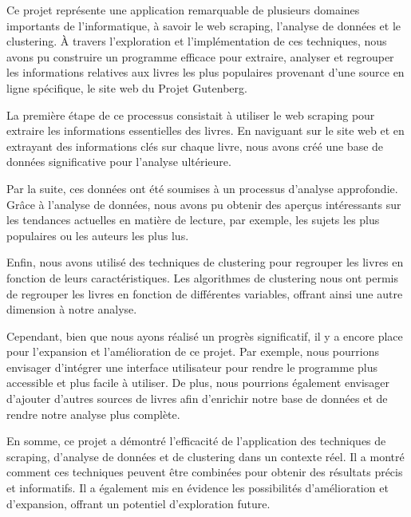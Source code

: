 Ce projet représente une application remarquable de plusieurs domaines importants de l'informatique, à savoir le web scraping, l'analyse de données et le clustering. À travers l'exploration et l'implémentation de ces techniques, nous avons pu construire un programme efficace pour extraire, analyser et regrouper les informations relatives aux livres les plus populaires provenant d'une source en ligne spécifique, le site web du Projet Gutenberg.

La première étape de ce processus consistait à utiliser le web scraping pour extraire les informations essentielles des livres. En naviguant sur le site web et en extrayant des informations clés sur chaque livre, nous avons créé une base de données significative pour l'analyse ultérieure.

Par la suite, ces données ont été soumises à un processus d'analyse approfondie. Grâce à l'analyse de données, nous avons pu obtenir des aperçus intéressants sur les tendances actuelles en matière de lecture, par exemple, les sujets les plus populaires ou les auteurs les plus lus.

Enfin, nous avons utilisé des techniques de clustering pour regrouper les livres en fonction de leurs caractéristiques. Les algorithmes de clustering nous ont permis de regrouper les livres en fonction de différentes variables, offrant ainsi une autre dimension à notre analyse.

Cependant, bien que nous ayons réalisé un progrès significatif, il y a encore place pour l'expansion et l'amélioration de ce projet. Par exemple, nous pourrions envisager d'intégrer une interface utilisateur pour rendre le programme plus accessible et plus facile à utiliser. De plus, nous pourrions également envisager d'ajouter d'autres sources de livres afin d'enrichir notre base de données et de rendre notre analyse plus complète.

En somme, ce projet a démontré l'efficacité de l'application des techniques de scraping, d'analyse de données et de clustering dans un contexte réel. Il a montré comment ces techniques peuvent être combinées pour obtenir des résultats précis et informatifs. Il a également mis en évidence les possibilités d'amélioration et d'expansion, offrant un potentiel d'exploration future.